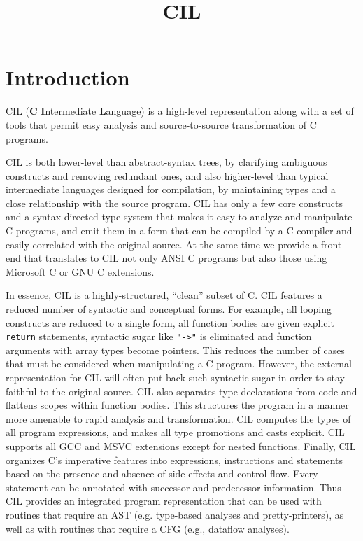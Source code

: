 \documentclass{article}
\title{CIL}
\begin{document}
\maketitle

\section{Introduction}

 CIL ({\bf C} {\bf I}ntermediate {\bf L}anguage) is a high-level representation
along with a set of tools that permit easy analysis and source-to-source
transformation of C programs.

 CIL is both lower-level than abstract-syntax trees, by clarifying ambiguous
constructs and removing redundant ones, and also higher-level than typical
intermediate languages designed for compilation, by maintaining types and a
close relationship with the source program. CIL has only a few core constructs
and a syntax-directed type system that makes it easy to analyze and manipulate
C programs, and emit them in a form that can be compiled by a C compiler and
easily correlated with the original source. At the same time we provide a
front-end that translates to CIL not only ANSI C programs but also those using
Microsoft C or GNU C extensions.

 In essence, CIL is a highly-structured, ``clean'' subset of C. CIL features a
reduced number of syntactic and conceptual forms. For example, all looping
constructs are reduced to a single form, all function bodies are given
explicit {\tt return} statements, syntactic sugar like {\tt "->"} is
eliminated and function arguments with array types become pointers. This
reduces the number of cases that must be considered when manipulating a C
program. However, the external representation for CIL will often put back such
syntactic sugar in order to stay faithful to the original source. CIL also
separates type declarations from code and flattens scopes within function
bodies. This structures the program in a manner more amenable to rapid
analysis and transformation. CIL computes the types of all program
expressions, and makes all type promotions and casts explicit. CIL supports
all GCC and MSVC extensions except for nested functions. Finally, CIL
organizes C's imperative features into expressions, instructions and
statements based on the presence and absence of side-effects and control-flow.
Every statement can be annotated with successor and predecessor
information. Thus CIL provides an integrated program representation that can
be used with routines that require an AST (e.g. type-based analyses and
pretty-printers), as well as with routines that require a CFG (e.g., dataflow analyses).
\end{document}

